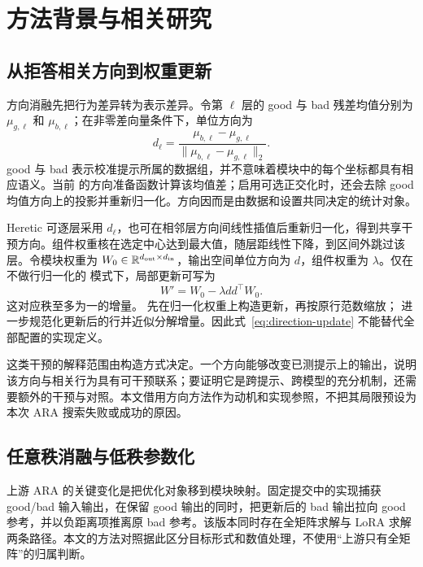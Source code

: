 \section{方法背景与相关研究}
\label{sec:background}

\subsection{从拒答相关方向到权重更新}

方向消融先把行为差异转为表示差异。令第 $\ell$ 层的 good 与 bad 残差均值分别为 $\mu_{g,\ell}$ 和 $\mu_{b,\ell}$；在非零差向量条件下，单位方向为
\begin{equation}
 d_\ell=\frac{\mu_{b,\ell}-\mu_{g,\ell}}
 {\|\mu_{b,\ell}-\mu_{g,\ell}\|_2}.
 \label{eq:direction}
\end{equation}
good 与 bad 表示校准提示所属的数据组，并不意味着模块中的每个坐标都具有相应语义。当前  的方向准备函数计算该均值差；启用可选正交化时，还会去除 good 均值方向上的投影并重新归一化。方向因而是由数据和设置共同决定的统计对象。

Heretic 可逐层采用 $d_\ell$，也可在相邻层方向间线性插值后重新归一化，得到共享干预方向。组件权重核在选定中心达到最大值，随层距线性下降，到区间外跳过该层。令模块权重为 $W_0\in\mathbb{R}^{d_{\rm out}\times d_{\rm in}}$，输出空间单位方向为 $d$，组件权重为 $\lambda$。仅在不做行归一化的  模式下，局部更新可写为
\begin{equation}
 W'=W_0-\lambda dd^\top W_0.
 \label{eq:direction-update}
\end{equation}
这对应秩至多为一的增量。 先在归一化权重上构造更新，再按原行范数缩放； 进一步规范化更新后的行并近似分解增量。因此式~\eqref{eq:direction-update} 不能替代全部配置的实现定义。

这类干预的解释范围由构造方式决定。一个方向能够改变已测提示上的输出，说明该方向与相关行为具有可干预联系；要证明它是跨提示、跨模型的充分机制，还需要额外的干预与对照。本文借用方向方法作为动机和实现参照，不把其局限预设为本次 ARA 搜索失败或成功的原因。

\subsection{任意秩消融与低秩参数化}

上游 ARA 的关键变化是把优化对象移到模块映射。固定提交中的实现捕获 good/bad 输入输出，在保留 good 输出的同时，把更新后的 bad 输出拉向 good 参考，并以负距离项推离原 bad 参考。该版本同时存在全矩阵求解与 LoRA 求解两条路径\cite{upstreamara}。本文的方法对照据此区分目标形式和数值处理，不使用“上游只有全矩阵”的归属判断。

